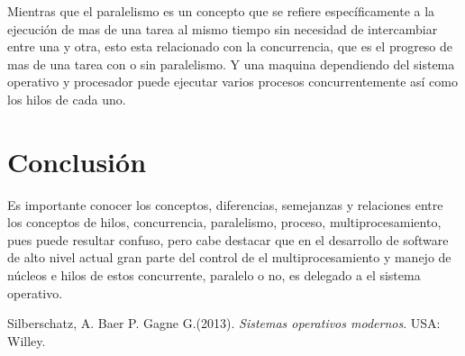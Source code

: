 \documentclass[spanish,12pt,letterpapper]{article}
\begin{document}
	Mientras que el paralelismo es un concepto que se refiere específicamente a la ejecución de mas de una tarea al mismo tiempo sin necesidad de intercambiar entre una y otra, esto esta relacionado con la concurrencia, que es el progreso de mas de una tarea con o sin paralelismo. Y una maquina dependiendo del sistema operativo y procesador puede ejecutar varios procesos concurrentemente así como los hilos de cada uno.
	
	\section{Conclusión}
	Es importante conocer los conceptos, diferencias, semejanzas y relaciones entre los conceptos de hilos, concurrencia, paralelismo, proceso, multiprocesamiento, pues puede resultar confuso, pero cabe destacar que en el desarrollo de software de alto nivel actual gran parte del control de el multiprocesamiento y manejo de núcleos e hilos de estos concurrente, paralelo o no, es delegado a el sistema operativo. 
	
	
	\pagebreak
	\begin{thebibliography}{9}
		 Silberschatz, A. Baer P. Gagne G.(2013).
		\emph{Sistemas operativos modernos}. USA: Willey.
		
	\end{thebibliography}
	
	
	
	
\end{document}
